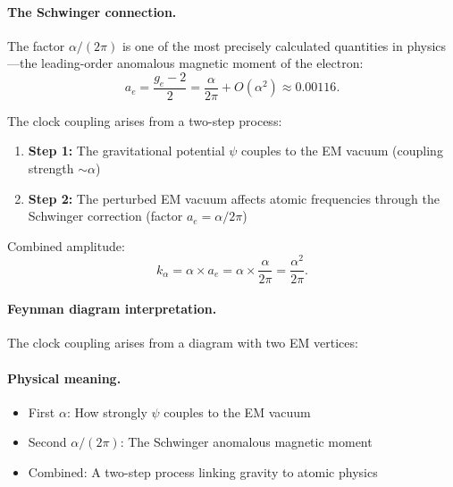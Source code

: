 \paragraph{The Schwinger connection.}
The factor $\alpha/(2\pi)$ is one of the most precisely calculated quantities in physics---the leading-order anomalous magnetic moment of the electron:
\begin{equation}
a_e = \frac{g_e - 2}{2} = \frac{\alpha}{2\pi} + O(\alpha^2) \approx 0.00116.
\end{equation}

The clock coupling arises from a two-step process:
\begin{enumerate}
\item \textbf{Step 1:} The gravitational potential $\psi$ couples to the EM vacuum (coupling strength $\sim \alpha$)
\item \textbf{Step 2:} The perturbed EM vacuum affects atomic frequencies through the Schwinger correction (factor $a_e = \alpha/2\pi$)
\end{enumerate}

Combined amplitude:
\begin{equation}
k_\alpha = \alpha \times a_e = \alpha \times \frac{\alpha}{2\pi} = \frac{\alpha^2}{2\pi}.
\end{equation}

\paragraph{Feynman diagram interpretation.}
The clock coupling arises from a diagram with two EM vertices:
\begin{center}
\end{center}

\paragraph{Physical meaning.}
\begin{itemize}
\item First $\alpha$: How strongly $\psi$ couples to the EM vacuum
\item Second $\alpha/(2\pi)$: The Schwinger anomalous magnetic moment
\item Combined: A two-step process linking gravity to atomic physics
\end{itemize}

